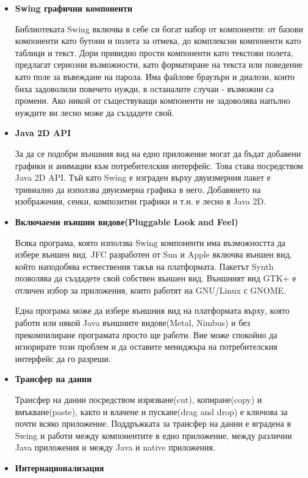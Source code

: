 \begin{itemize}
  \item \textbf{Swing графични компоненти}

    Библиотеката Swing включва в себе си богат набор от компоненти: от
    базови компоненти като бутони и полета за отмека, до комплексни
    компоненти като таблици и текст. Дори привидно прости компоненти
    като текстови полета, предлагат сериозни възможности, като
    форматиране на текста или поведение като поле за въвеждане на
    парола. Има файлове браузъри и диалози, които биха задоволили
    повечето нужди, в останалите случаи - възможни са промени. Ако
    никой от съществуващи компоненти не задоволява напълно нуждите ви
    лесно може да създадете свой.
  \item \textbf{Java 2D API}

    За да се подобри външния вид на едно приложение могат да бъдат
    добавени графики и анимации към потребителския интерфейс. Това
    става посредством Java 2D API. Тъй като Swing е изграден върху
    двуизмерния пакет е тривиално да използва двуизмерна графика в
    него. Добавянето на изображения, сенки, композитни графики и
    т.н. е лесно в Java 2D.
  \item \textbf{Включаеми външни видове(Pluggable Look and Feel)}
    
    Всяка програма, която използва Swing компоненти има възможността
    да избере външен вид. JFC разработен от Sun и Apple включва външен
    вид, който наподобява ествествения такъв на платформата. Пакетът
    Synth позволява да създадете свой собствен външен вид. Външният
    вид GTK+ е отличен избор за приложения, които работят на GNU/Linux
    с GNOME.

    Една програма може да избере външния вид на платформата върху,
    която работи или някой Java външните видове(Metal, Nimbus) и без
    прекомпилиране програмата просто ще работи. Вие може спокойно да
    игнорирате този проблем и да оставите мениджъра на потребителския
    интерфейс да го разреши.
  \item \textbf{Трансфер на данни}
    
    Трансфер на данни посредством изрязване(cut), копиране(copy) и
    вмъкване(paste), както и влачене и пускане(drag and drop) е
    ключова за почти всяко приложение. Поддръжката за трансфер на
    данни е вградена в Swing и работи между компонентите в едно
    приложение, между различни Java приложения и между Java и native
    приложения.
  \item \textbf{Интернационализация}


\end{itemize}
